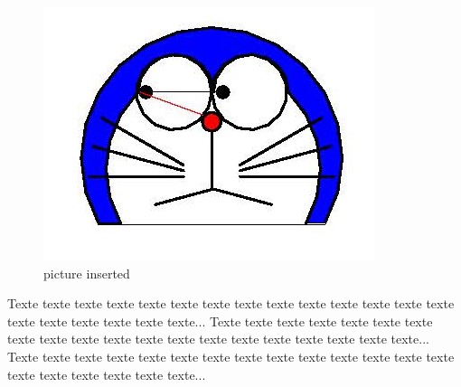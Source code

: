 \documentclass{article}
\begin{document}
\begin{figure}%
    \centering
    \includegraphics[scale=.3]{doraemon1.jpg}
    \caption{picture inserted}
\end{figure}
Texte texte texte texte texte texte texte
texte texte texte texte texte texte texte
texte texte texte texte texte texte...
Texte texte texte texte texte texte texte
texte texte texte texte texte texte texte
texte texte texte texte texte texte...
Texte texte texte texte texte texte texte
texte texte texte texte texte texte texte
texte texte texte texte texte texte...

\clearpage
\listoffigures
\end{document}
